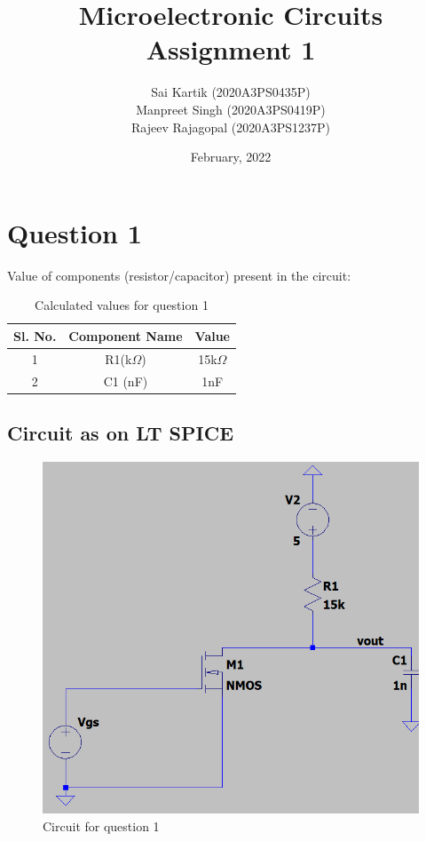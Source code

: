 \documentclass{report}[12pt]
\title{Microelectronic Circuits Assignment 1}
\author{Sai Kartik (2020A3PS0435P)\\ Manpreet Singh (2020A3PS0419P)\\ Rajeev Rajagopal (2020A3PS1237P)}
\date{February, 2022}
\begin{document}
\maketitle
\section*{Question 1}
Value of components (resistor/capacitor) present in the circuit:
\begin{table}[ht]
    \centering
    \caption{Calculated values for question 1}
    \begin{tabular}{|c | c | c|}
        \hline
        Sl. No. & Component Name & Value       \\
        \hline
        1       & R1(k$\Omega$)  & 15k$\Omega$ \\ %
        2       & C1 (nF)        & 1nF         \\ %
        \hline
    \end{tabular}
    \label{tab:values1}
\end{table}
\subsection*{Circuit as on LT SPICE}
\begin{figure}[ht]
    \centering
    \includegraphics[scale=0.50]{resources/q1.png}
    \caption{Circuit for question 1}
    \label{fig:circuit1}
\end{figure}
\newpage
\end{document}
